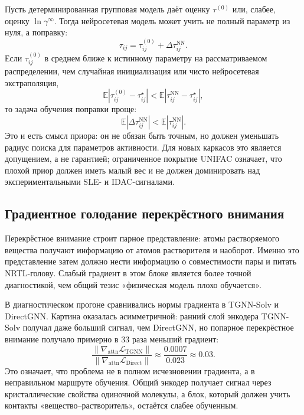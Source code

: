\documentclass[11pt]{article}
\newcommand{\E}{\mathbb{E}}
\newcommand{\abs}[1]{\left\lvert #1 \right\rvert}
\theoremstyle{definition}
\begin{document}
Пусть детерминированная групповая модель даёт оценку $\tau^{(0)}$ или, слабее, оценку $\ln\gamma^\infty$. Тогда нейросетевая модель может учить не полный параметр из нуля, а поправку:
\begin{equation*}
    \tau_{ij}=\tau_{ij}^{(0)}+\Delta\tau_{ij}^{\mathrm{NN}}.
\end{equation*}
Если $\tau_{ij}^{(0)}$ в среднем ближе к истинному параметру на рассматриваемом распределении, чем случайная инициализация или чисто нейросетевая экстраполяция,
\begin{equation*}
    \E\abs{\tau_{ij}^{(0)}-\tau_{ij}^{\star}}
    <
    \E\abs{\tau_{ij}^{\mathrm{NN}}-\tau_{ij}^{\star}},
\end{equation*}
то задача обучения поправки проще:
\begin{equation*}
    \E\abs{\Delta\tau_{ij}^{\mathrm{NN}}}
    < \E\abs{\tau_{ij}^{\mathrm{NN}}}.
\end{equation*}
Это и есть смысл приора: он не обязан быть точным, но должен уменьшать радиус поиска для параметров активности. Для новых каркасов это является допущением, а не гарантией; ограниченное покрытие UNIFAC означает, что плохой приор должен иметь малый вес и не должен доминировать над экспериментальными SLE- и IDAC-сигналами.

\subsection{Градиентное голодание перекрёстного внимания}
\label{app:cross-attention-starvation}

Перекрёстное внимание строит парное представление: атомы растворяемого вещества получают информацию от атомов растворителя и наоборот. Именно это представление затем должно нести информацию о совместимости пары и питать NRTL-голову. Слабый градиент в этом блоке является более точной диагностикой, чем общий тезис «физическая модель плохо обучается».

В диагностическом прогоне сравнивались нормы градиента в TGNN-Solv и DirectGNN. Картина оказалась асимметричной: ранний слой энкодера TGNN-Solv получал даже больший сигнал, чем DirectGNN, но попарное перекрёстное внимание получало примерно в $33$ раза меньший градиент:
\begin{equation*}
    \frac{\|\nabla_{\mathrm{attn}}\mathcal L_{\mathrm{TGNN}}\|}
         {\|\nabla_{\mathrm{attn}}\mathcal L_{\mathrm{Direct}}\|}
    \approx
    \frac{0.0007}{0.023}
    \approx 0.03.
\end{equation*}
Это означает, что проблема не в полном исчезновении градиента, а в неправильном маршруте обучения. Общий энкодер получает сигнал через кристаллические свойства одиночной молекулы, а блок, который должен учить контакты «вещество--растворитель», остаётся слабее обученным.
\end{document}
